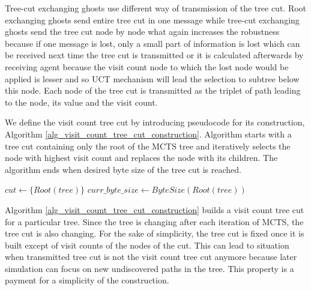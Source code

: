 Tree-cut exchanging ghosts use different way of transmission of the tree cut. Root exchanging
ghosts send entire tree cut in one message while tree-cut exchanging ghosts send the tree cut
node by node what again increases the robustness because if one message is lost, only a small
part of information is lost which can be received next time the tree cut is transmitted or it
is calculated afterwards by receiving agent because the visit count node to which the lost node 
would be
applied is lesser and so UCT mechanism will lead the selection to subtree below this node. Each
node of the tree cut is transmitted as the triplet of path leading to the node, its value and
the visit count.

We define the visit count tree cut by introducing pseudocode for its construction, Algorithm
\ref{alg_visit_count_tree_cut_construction}. Algorithm starts with a tree cut containing only
the root of the MCTS tree and iteratively selects the node with highest visit count and
replaces the node with its children. The algorithm ends when desired byte size of the tree cut
is reached.

\begin{algorithm}
\DontPrintSemicolon
\caption{$BuildVisitCountTreeCut(tree,byte\_size)$\label{alg_visit_count_tree_cut_construction}}
$cut \leftarrow \{Root(tree)\}$ \;
$curr\_byte\_size \leftarrow ByteSize(Root(tree))$\;
\end{algorithm}

Algorithm \ref{alg_visit_count_tree_cut_construction} builds a visit count tree cut for a
particular tree. Since the tree is changing after each iteration of MCTS, the tree cut is also
changing. For the sake of simplicity, the tree cut is fixed once it is built except of visit
counts of the nodes of the cut. This can lead to situation when transmitted tree cut is not the
visit count tree cut anymore because later simulation can focus on new undiscovered paths in
the tree. This property is a payment for a simplicity of the construction.

